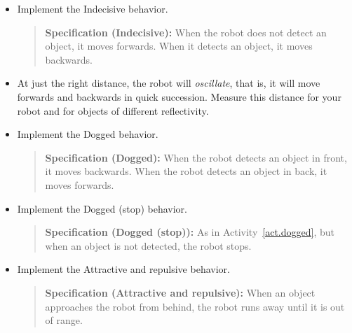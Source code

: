 \begin{framed}
\begin{itemize}
\item Implement the Indecisive behavior.
\begin{quote}
\normalsize\noindent\textbf{Specification (Indecisive):} When the robot does not detect an object, it moves forwards. When it detects an object, it moves backwards.
\end{quote}
\item At just the right distance, the robot will \emph{oscillate}, that is, it will move forwards and backwards in quick succession. Measure this distance for your robot and for objects of different reflectivity.
\end{itemize}
\end{framed}

\begin{framed}
\begin{itemize}
\item Implement the Dogged behavior.
\begin{quote}
\normalsize\noindent\textbf{Specification (Dogged):} When the robot detects an object in front, it moves backwards. When the robot detects an object in back, it moves forwards.
\end{quote}
\end{itemize}
\end{framed}

\begin{framed}
\begin{itemize}
\item Implement the Dogged (stop) behavior.
\begin{quote}
\normalsize\noindent\textbf{Specification (Dogged (stop)):} As in Activity~\ref{act.dogged}, but when an object is not detected, the robot stops.
\end{quote}
\end{itemize}
\end{framed}

\begin{framed}
\begin{itemize}
\item Implement the Attractive and repulsive behavior.
\begin{quote}
\normalsize\noindent\textbf{Specification (Attractive and repulsive):} When an object approaches the robot from behind, the robot runs away until it is out of range.
\end{quote}
\end{itemize}
\end{framed}

